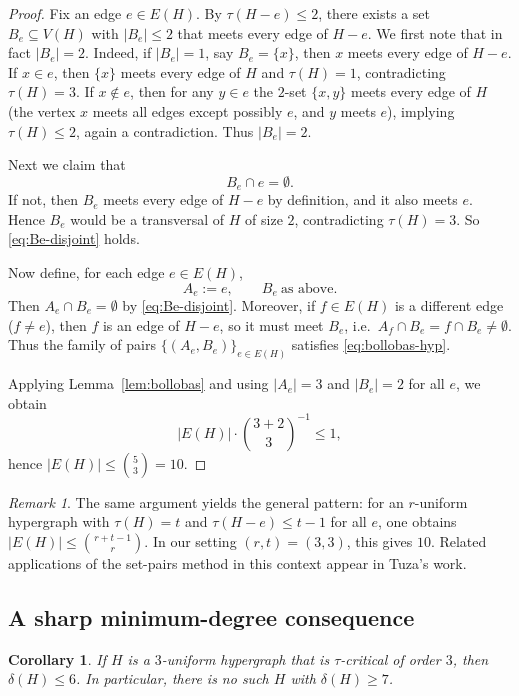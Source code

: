 \documentclass[11pt]{amsart}
\newtheorem{corollary}[theorem]{Corollary}
\theoremstyle{definition}
\theoremstyle{remark}
\newtheorem{remark}[theorem]{Remark}
\newcommand{\V}{V}
\newcommand{\E}{E}
\newcommand{\del}{\delta}
\begin{document}
\begin{proof}
Fix an edge $e\in \E(H)$.
By $\tau(H-e)\le 2$, there exists a set $B_e\subseteq \V(H)$ with $|B_e|\le 2$ that meets every edge of $H-e$.
We first note that in fact $|B_e|=2$.
Indeed, if $|B_e|=1$, say $B_e=\{x\}$, then $x$ meets every edge of $H-e$.
If $x\in e$, then $\{x\}$ meets every edge of $H$ and $\tau(H)=1$, contradicting $\tau(H)=3$.
If $x\notin e$, then for any $y\in e$ the $2$-set $\{x,y\}$ meets every edge of $H$ (the vertex $x$ meets all edges except possibly $e$, and $y$ meets $e$), implying $\tau(H)\le 2$, again a contradiction.
Thus $|B_e|=2$.

Next we claim that
\begin{equation}\label{eq:Be-disjoint}
B_e\cap e=\emptyset.
\end{equation}
If not, then $B_e$ meets every edge of $H-e$ by definition, and it also meets $e$.
Hence $B_e$ would be a transversal of $H$ of size $2$, contradicting $\tau(H)=3$.
So \eqref{eq:Be-disjoint} holds.

Now define, for each edge $e\in \E(H)$,
\[
A_e:=e,\qquad B_e\ \text{as above}.
\]
Then $A_e\cap B_e=\emptyset$ by \eqref{eq:Be-disjoint}.
Moreover, if $f\in \E(H)$ is a different edge ($f\neq e$), then $f$ is an edge of $H-e$, so it must meet $B_e$, i.e.\ $A_f\cap B_e=f\cap B_e\neq\emptyset$.
Thus the family of pairs $\{(A_e,B_e)\}_{e\in \E(H)}$ satisfies \eqref{eq:bollobas-hyp}.

Applying Lemma~\ref{lem:bollobas} and using $|A_e|=3$ and $|B_e|=2$ for all $e$, we obtain
\[
|\E(H)|\cdot \binom{3+2}{3}^{-1}\le 1,
\]
hence $|\E(H)|\le \binom{5}{3}=10$.
\end{proof}

\begin{remark}
The same argument yields the general pattern: for an $r$-uniform hypergraph with $\tau(H)=t$ and $\tau(H-e)\le t-1$ for all $e$, one obtains $|\E(H)|\le \binom{r+t-1}{r}$.
In our setting $(r,t)=(3,3)$, this gives $10$.
Related applications of the set-pairs method in this context appear in Tuza's work.\cite{Tuza1985}
\end{remark}

\subsection{A sharp minimum-degree consequence}

\begin{corollary}\label{cor:tau-mindeg}
If $H$ is a $3$-uniform hypergraph that is $\tau$-critical of order $3$, then $\del(H)\le 6$.
In particular, there is no such $H$ with $\del(H)\ge 7$.
\end{corollary}
\end{document}
